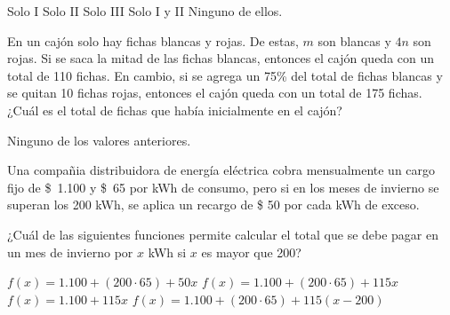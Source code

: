 \documentclass{sn-guia}
\begin{document}
\begin{problemas}
\begin{alternativasgraficas}[title={\RNum{\thetcbrasternum})},raster columns=3]
        \grafica 
        \grafica 
    \end{alternativasgraficas}
    \begin{alternativas}
        \alternativa Solo I
        \alternativa Solo II
        \alternativa Solo III
        \alternativa Solo I y II
        \alternativa Ninguno de ellos.
    \end{alternativas}

    \problema En un cajón solo hay fichas blancas y rojas. De estas, $m$ son blancas y 
    $4n$ son rojas. Si se saca la mitad de las fichas blancas, entonces el cajón queda con un
    total de 110 fichas. En cambio, si se agrega un 75\% del total de fichas blancas y se
    quitan 10 fichas rojas, entonces el cajón queda con un total de 175 fichas. ¿Cuál es 
    el total de fichas que había inicialmente en el cajón?
    \begin{alternativas}
        \alternativa Ninguno de los valores anteriores.
    \end{alternativas}

    \problema Una compañia distribuidora de energía eléctrica cobra mensualmente un cargo
    fijo de \mbox{\$ 1.100} y \mbox{\$ 65} por kWh de consumo, pero si en los meses de invierno se superan
    los 200 kWh, se aplica un recargo de \$ 50 por cada kWh de exceso.
    
    ¿Cuál de las siguientes funciones permite calcular el total que se debe pagar en un mes
    de invierno por $x$ kWh si $x$ es mayor que 200?
    \begin{alternativas}
        \alternativa $f(x) = 1.100 + (200\cdot 65) + 50x$
        \alternativa $f(x) = 1.100 + (200\cdot 65) + 115x$
        \alternativa $f(x) = 1.100 + 115x$
        \alternativa $f(x) = 1.100 + (200\cdot 65) + 115(x-200)$
    \end{alternativas}
    

\end{problemas}
\end{document}
